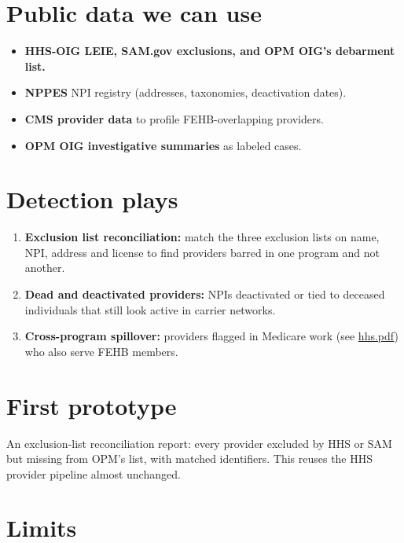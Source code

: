 \documentclass[letterpaper,11pt]{article}
\providecommand{\tightlist}{\setlength{\itemsep}{0pt}\setlength{\parskip}{0pt}}
\begin{document}
\hypertarget{public-data-we-can-use}{%
\section{Public data we can use}\label{public-data-we-can-use}}

\begin{itemize}
\tightlist
\item
  \textbf{HHS-OIG LEIE, SAM.gov exclusions, and OPM OIG's debarment
  list.}
\item
  \textbf{NPPES} NPI registry (addresses, taxonomies, deactivation
  dates).
\item
  \textbf{CMS provider data} to profile FEHB-overlapping providers.
\item
  \textbf{OPM OIG investigative summaries} as labeled cases.
\end{itemize}

\hypertarget{detection-plays}{%
\section{Detection plays}\label{detection-plays}}

\begin{enumerate}
\def\labelenumi{\arabic{enumi}.}
\tightlist
\item
  \textbf{Exclusion list reconciliation:} match the three exclusion
  lists on name, NPI, address and license to find providers barred in
  one program and not another.
\item
  \textbf{Dead and deactivated providers:} NPIs deactivated or tied to
  deceased individuals that still look active in carrier networks.
\item
  \textbf{Cross-program spillover:} providers flagged in Medicare work
  (see \url{hhs.pdf}) who also serve FEHB members.
\end{enumerate}

\hypertarget{first-prototype}{%
\section{First prototype}\label{first-prototype}}

An exclusion-list reconciliation report: every provider excluded by HHS
or SAM but missing from OPM's list, with matched identifiers. This
reuses the HHS provider pipeline almost unchanged.

\hypertarget{limits}{%
\section{Limits}\label{limits}}
\end{document}
